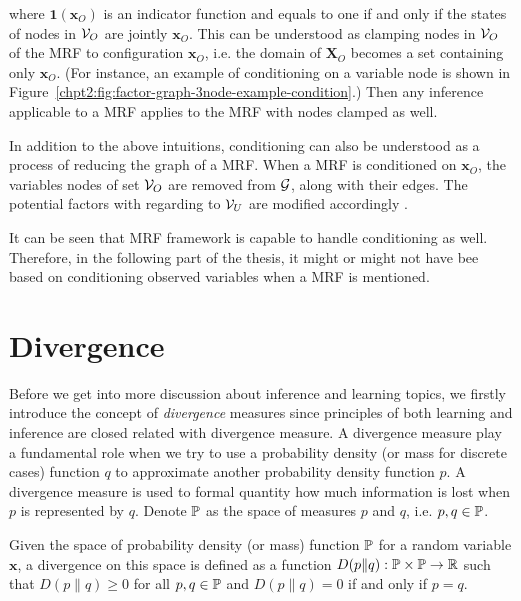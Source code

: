 where $\bm{1}(\bm{x}_O)$ is an indicator function and equals to one if and only if the states of nodes in $\mathcal{V}_O$ are jointly $\bm{x}_O$. This can be understood as clamping nodes in $\mathcal{V}_O$ of the MRF to configuration $\bm{x}_O$, i.e. the domain of $\bm{X}_O$ becomes a set containing only $\bm{x}_O$. (For instance, an example of conditioning on a variable node is shown in Figure~\ref{chpt2:fig:factor-graph-3node-example-condition}.) Then any inference applicable to a MRF applies to the MRF with nodes clamped as well.

In addition to the above intuitions, conditioning can also be understood as a process of reducing the graph of a MRF. When a MRF is conditioned on $\bm{x}_O$, the variables nodes of set $\mathcal{V}_O$ are removed from $\mathcal{G}$, along with their edges. The potential factors with regarding to $\mathcal{V}_U$ are modified accordingly \cite[Chapter~4.2.3]{koller2009pgm}.

It can be seen that MRF framework is capable to handle conditioning as well. Therefore, in the following part of the thesis, it might or might not have bee based on conditioning observed variables when a MRF is mentioned.

\section{Divergence}\label{chpt2:sec:devergence}
Before we get into more discussion about inference and learning topics, we firstly introduce the concept of \textit{divergence} measures since principles of both learning and inference are closed related with divergence measure.
A divergence measure play a fundamental role when we try to use a probability density (or mass for discrete cases) function $q$ to approximate another probability density function $p$. A divergence measure is used to formal quantity how much information is lost when $p$ is represented by $q$. Denote $\mathbb{P}$ as the space of measures $p$ and $q$, i.e. $p, q \in \mathbb{P}$.
\begin{definition}
  Given the space of probability density (or mass) function $\mathbb{P}$ for a random variable $\bm{x}$, a divergence on this space is defined as a function $D(p\|q): \mathbb{P} \times \mathbb{P} \rightarrow \mathbb{R}$ such that $D(p\|q) \geq 0$ for all $p, q \in \mathbb{P}$ and $D(p\|q)=0$ if and only if $p=q$.
\end{definition}

